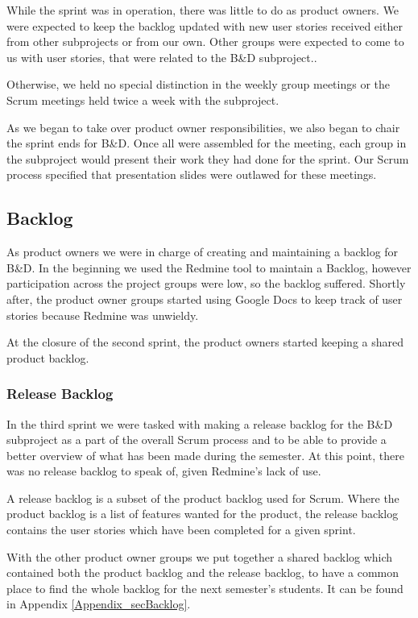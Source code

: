 While the sprint was in operation, there was little to do as product owners. We were expected to keep the backlog updated with new user stories received either from other subprojects or from our own. Other groups were expected to come to us with user stories, that were related to the B\&D subproject..

Otherwise, we held no special distinction in the weekly group meetings or the Scrum meetings held twice a week with the subproject.

As we began to take over product owner responsibilities, we also began to chair the sprint ends for B\&D. Once all were assembled for the meeting, each group in the subproject would present their work they had done for the sprint. Our Scrum process specified that presentation slides were outlawed for these meetings.

\subsection{Backlog} \label{Roles_SecReleaseBacklog}
As product owners we were in charge of creating and maintaining a backlog for B\&D. In the beginning we used the Redmine tool to maintain a Backlog, however participation across the project groups were low, so the backlog suffered. Shortly after, the product owner groups started using Google Docs to keep track of user stories because Redmine was unwieldy.

At the closure of the second sprint, the product owners started keeping a shared product backlog.

\subsubsection{Release Backlog}
In the third sprint we were tasked with making a release backlog for the B\&D subproject as a part of the overall Scrum process and to be able to provide a better overview of what has been made during the semester. At this point, there was no release backlog to speak of, given Redmine's lack of use.

A release backlog is a subset of the product backlog used for Scrum. Where the product backlog is a list of features wanted for the product, the release backlog contains the user stories which have been completed for a given sprint.

With the other product owner groups we put together a shared backlog which contained both the product backlog and the release backlog, to have a common place to find the whole backlog for the next semester’s students. It can be found in Appendix \ref{Appendix_secBacklog}.

